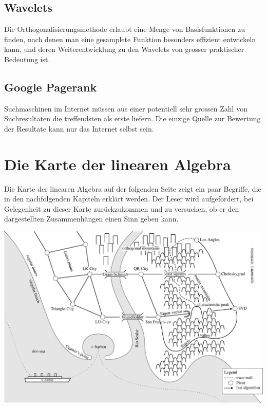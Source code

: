 \subsection*{Wavelets}
Die Orthogonalisierungsmethode erlaubt eine Menge von
Basisfunktionen zu finden, nach denen man eine gesamplete Funktion
besonders effizient entwickeln kann, und deren Weiterentwicklung
zu den Wavelets von grosser praktischer Bedeutung ist.

\subsection*{Google Pagerank}
Suchmaschinen im Internet müssen aus einer potentiell sehr grossen Zahl
von Suchresultaten die treffendsten als erste liefern.
Die einzige Quelle zur Bewertung der Resultate kann nur
das Internet selbst sein.

\section*{Die Karte der linearen Algebra}
Die Karte der linearen Algebra auf der folgenden Seite zeigt ein
paar Begriffe, die in den nachfolgenden Kapiteln erklärt werden.
Der Leser wird aufgefordert, bei Gelegenheit zu dieser Karte
zurückzukommen und zu versuchen, ob er den dargestellten
Zusammenhängen einen Sinn geben kann.

\begin{landscape}
\begin{center}
\includegraphics[width=0.95\hsize]{images/linalgmap-1}
\end{center}
\end{landscape}
